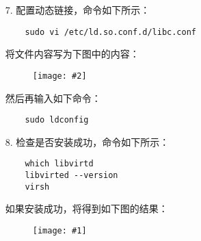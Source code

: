 \documentclass[a4paper,left=2.5cm,right=2.5cm,11pt]{article}
\newcommand{\fic}[1]{\begin{figure}[H]
		\center
		\texttt{[image: \#1]}
	\end{figure}}
\newcommand{\sizedfic}[2]{\begin{figure}[H]
		\center
		\texttt{[image: \#2]}
	\end{figure}}
\begin{document}
\begin{itemize}
		\item[7.] 配置动态链接，命令如下所示：
		\begin{lstlisting}
	sudo vi /etc/ld.so.conf.d/libc.conf
		\end{lstlisting}

		将文件内容写为下图中的内容：
		\sizedfic{0.5}{1.png}

		然后再输入如下命令：
		\begin{lstlisting}
	sudo ldconfig
		\end{lstlisting}

		\item[8.] 检查是否安装成功，命令如下所示：
		\begin{lstlisting}
	which libvirtd
	libvirted --version
	virsh
		\end{lstlisting}

		如果安装成功，将得到如下图的结果：
		\fic{2.png}
	\end{itemize}
\end{document}
